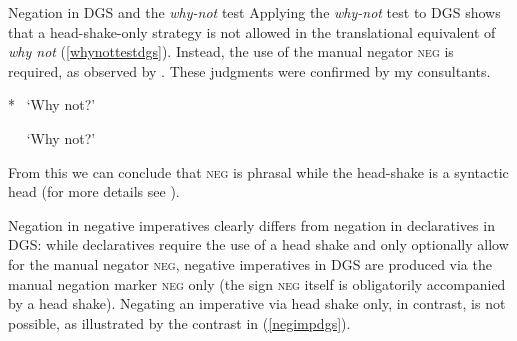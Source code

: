\begin{digression}{Negation in DGS and the \textit{why-not} test}{}
Applying the \textit{why-not} test to DGS shows that a head-shake-only strategy is not allowed in the translational equivalent of \textit{why not} (\ref{whynottestdgs}). Instead, the use of the manual negator \textsc{neg} is required, as observed by \citet[56]{pfau2016featural}. These judgments were confirmed by my consultants. 

\begin{exe}
\ex\label{whynottestdgs}\begin{xlist}
\ex\label{ex:modaldoublingneg} *
\glt \textcolor{white}{*}`Why not?'

\ex\label{ex:modaldoublingnegb} \textcolor{white}{*}
\glt \textcolor{white}{*}`Why not?'
\end{xlist}
\end{exe}


\noindent From this we can conclude that \textsc{neg} is phrasal while the head-shake is a syntactic head (for more details see \citealt{pfau2016featural}).

 

\end{digression}

\largerpage
\noindent Negation in negative imperatives clearly differs from negation in declaratives in DGS: while declaratives require the use of a head shake and only optionally allow for the manual negator \textsc{neg}, negative imperatives in DGS are produced via the manual negation marker \textsc{neg} only (the sign \textsc{neg} itself is obligatorily accompanied by a head shake). Negating an imperative via head shake only, in contrast, is not possible, as illustrated by the contrast in (\ref{negimpdgs}).   

